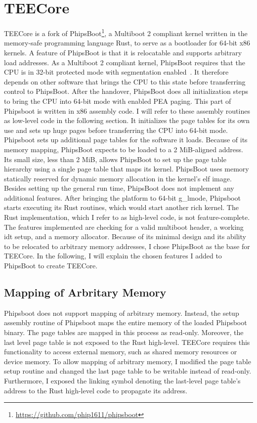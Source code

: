 \section{TEECore}
\label{sec:implementation:teeKernel}
TEECore is a fork of
PhipsBoot\footnote{\url{https://github.com/phip1611/phipsboot}}, a Multiboot 2
compliant kernel written in the memory-safe programming language Rust, to serve
as a bootloader for 64-bit x86 kernels. A feature of PhipsBoot is that it is
relocatable and supports arbitrary load addresses. As a Multiboot 2 compliant
kernel, PhipsBoot requires that the CPU is in 32-bit protected mode with
segmentation enabled~\cite{mb2}. It therefore depends on other software that
brings the CPU to this state before transferring control to PhipsBoot. After the
handover, PhipsBoot does all initialization steps to bring the CPU into 64-bit
mode with enabled PEA paging. This part of Phipsboot is written in x86 assembly
code. I will refer to these assembly routines as low-level code in the following
section. It initializes the page tables for its own use and sets up huge pages
before transferring the CPU into 64-bit mode. Phipsboot sets up additional page
tables for the software it loads. Because of its memory mapping, PhipsBoot
expects to be loaded to a 2 MiB-aligned address. Its small size, less than 2
MiB, allows PhipsBoot to set up the page table hierarchy using a single page
table that maps its kernel. PhipsBoot uses memory statically reserved for
dynamic memory allocation in the kernel's \gls{elf} image. Besides setting up
the general run time, PhipsBoot does not implement any additional features.
After bringing the platform to 64-bit \gls{g_lmode}, Phipsboot starts executing
its Rust routines, which would start another rich kernel. The Rust
implementation, which I refer to as high-level code, is not feature-complete.
The features implemented are checking for a valid multiboot header, a working
\gls{idt} setup, and a memory allocator. Because of its minimal design and its
ability to be relocated to arbitrary memory addresses, I chose PhipsBoot as the
base for TEECore. In the following, I will explain the chosen features I added
to PhipsBoot to create TEECore.\\

\subsection{Mapping of Arbritary Memory}
\label{sec:implementation:teeKernel:mem}
Phipsboot does not support mapping of arbitrary memory. Instead, the setup
assembly routine of Phipsboot maps the entire memory of the loaded Phipsboot
binary. The page tables are mapped in this process as read-only. Moreover, the
last level page table is not exposed to the Rust high-level. TEECore requires
this functionality to access external memory, such as shared memory resources or
device memory. To allow mapping of arbitrary memory, I modified the page table
setup routine and changed the last page table to be writable instead of
read-only. Furthermore, I exposed the linking symbol denoting the last-level
page table's address to the Rust high-level code to propagate its address.\\


